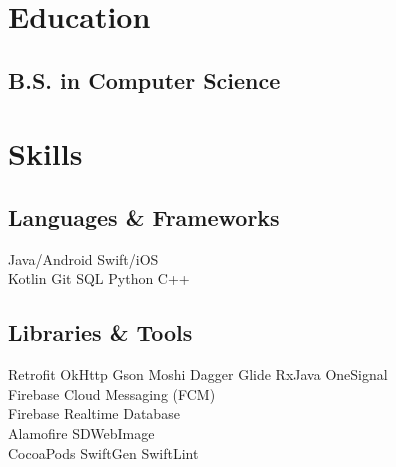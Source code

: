 \documentclass[]{Resume}
\begin{document}
%
%
\lastupdated

%
%

%
%

\begin{minipage}[t]{0.33\textwidth} 


\section{Education} 

\subsection{B.S. in Computer Science}
\sectionsep

\section{Skills}
\subsection{Languages \& Frameworks}
Java/Android \textbullet{}   Swift/iOS \\
Kotlin \textbullet{} Git \textbullet{} SQL \textbullet{} Python \textbullet{} C++ \\
\sectionsep

\subsection{Libraries \& Tools}
Retrofit \textbullet{} OkHttp \textbullet{} Gson \textbullet{} Moshi  \textbullet{} 
Dagger \textbullet{} Glide \textbullet{} RxJava \textbullet{} OneSignal \\
\vspace{\topsep}
Firebase Cloud Messaging (FCM) \textbullet{} \\
Firebase Realtime Database \textbullet{} \\
Alamofire \textbullet{} SDWebImage \textbullet{} \\
CocoaPods \textbullet{} SwiftGen \textbullet{} SwiftLint
\sectionsep


\end{minipage}
\end{document}
